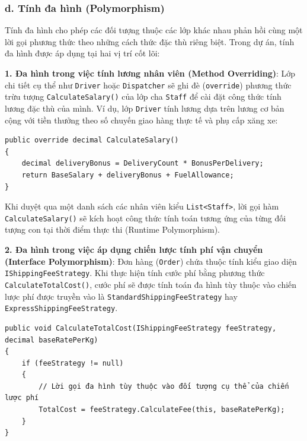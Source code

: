 \documentclass[12pt,a4paper]{article}
\begin{document}
\subsubsection*{d. Tính đa hình (Polymorphism)}

Tính đa hình cho phép các đối tượng thuộc các lớp khác nhau phản hồi cùng một lời gọi phương thức theo những cách thức đặc thù riêng biệt. Trong dự án, tính đa hình được áp dụng tại hai vị trí cốt lõi:

\textbf{1. Đa hình trong việc tính lương nhân viên (Method Overriding)}:
Lớp chi tiết cụ thể như \texttt{Driver} hoặc \texttt{Dispatcher} sẽ ghi đè (\texttt{override}) phương thức trừu tượng \texttt{CalculateSalary()} của lớp cha \texttt{Staff} để cài đặt công thức tính lương đặc thù của mình. Ví dụ, lớp \texttt{Driver} tính lương dựa trên lương cơ bản cộng với tiền thưởng theo số chuyến giao hàng thực tế và phụ cấp xăng xe:

\begin{listing}[H]
\caption{Ghi đè phương thức tính lương của tài xế (Driver)}
\begin{verbatim}
public override decimal CalculateSalary()
{
    decimal deliveryBonus = DeliveryCount * BonusPerDelivery;
    return BaseSalary + deliveryBonus + FuelAllowance;
}
\end{verbatim}
\end{listing}

Khi duyệt qua một danh sách các nhân viên kiểu \texttt{List<Staff>}, lời gọi hàm \texttt{CalculateSalary()} sẽ kích hoạt công thức tính toán tương ứng của từng đối tượng con tại thời điểm thực thi (Runtime Polymorphism).

\textbf{2. Đa hình trong việc áp dụng chiến lược tính phí vận chuyển (Interface Polymorphism)}:
Đơn hàng (\texttt{Order}) chứa thuộc tính kiểu giao diện \texttt{IShippingFeeStrategy}. Khi thực hiện tính cước phí bằng phương thức \texttt{CalculateTotalCost()}, cước phí sẽ được tính toán đa hình tùy thuộc vào chiến lược phí được truyền vào là \texttt{StandardShippingFeeStrategy} hay \texttt{ExpressShippingFeeStrategy}.

\begin{listing}[H]
\caption{Đa hình trong tính phí vận chuyển của đơn hàng}
\begin{verbatim}
public void CalculateTotalCost(IShippingFeeStrategy feeStrategy, decimal baseRatePerKg)
{
    if (feeStrategy != null)
    {
        // Lời gọi đa hình tùy thuộc vào đối tượng cụ thể của chiến lược phí
        TotalCost = feeStrategy.CalculateFee(this, baseRatePerKg);
    }
}
\end{verbatim}
\end{listing}
\end{document}
